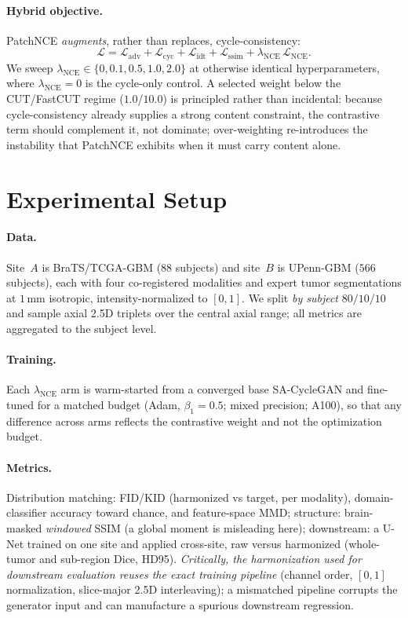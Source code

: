 \documentclass[runningheads]{llncs}
\begin{document}
\paragraph{Hybrid objective.}
PatchNCE \emph{augments}, rather than replaces, cycle-consistency:
\begin{equation}
  \mathcal{L} = \mathcal{L}_{\mathrm{adv}} + \mathcal{L}_{\mathrm{cyc}}
  + \mathcal{L}_{\mathrm{idt}} + \mathcal{L}_{\mathrm{ssim}}
  + \lambda_{\mathrm{NCE}}\,\mathcal{L}_{\mathrm{NCE}}.
  \label{eq:total}
\end{equation}
We sweep $\lambda_{\mathrm{NCE}}\in\{0,0.1,0.5,1.0,2.0\}$ at otherwise identical
hyperparameters, where $\lambda_{\mathrm{NCE}}{=}0$ is the cycle-only control.
A selected weight below the CUT/FastCUT regime ($1.0$/$10.0$) is principled
rather than incidental: because cycle-consistency already supplies a strong
content constraint, the contrastive term should complement it, not dominate;
over-weighting re-introduces the instability that PatchNCE exhibits when it must
carry content alone.

\section{Experimental Setup}
\label{sec:exp}
\paragraph{Data.}
Site~$A$ is BraTS/TCGA-GBM ($88$ subjects) and site~$B$ is UPenn-GBM ($566$
subjects), each with four co-registered modalities and expert tumor
segmentations at $1\,\mathrm{mm}$ isotropic, intensity-normalized to $[0,1]$. We
split \emph{by subject} $80/10/10$ and sample axial 2.5D triplets over the central
axial range; all metrics are aggregated to the subject level.
\paragraph{Training.}
Each $\lambda_{\mathrm{NCE}}$ arm is warm-started from a converged base
SA-CycleGAN and fine-tuned for a matched budget (Adam, $\beta_1{=}0.5$; mixed
precision; A100), so that any difference across arms reflects the contrastive
weight and not the optimization budget.
\paragraph{Metrics.}
Distribution matching: FID/KID (harmonized vs target, per modality), domain-
classifier accuracy toward chance, and feature-space MMD; structure: brain-masked
\emph{windowed} SSIM (a global moment is misleading here); downstream: a U-Net
trained on one site and applied cross-site, raw versus harmonized (whole-tumor and
sub-region Dice, HD95). \emph{Critically, the harmonization used for downstream
evaluation reuses the exact training pipeline} (channel order, $[0,1]$
normalization, slice-major 2.5D interleaving); a mismatched pipeline corrupts the
generator input and can manufacture a spurious downstream regression.
\end{document}
